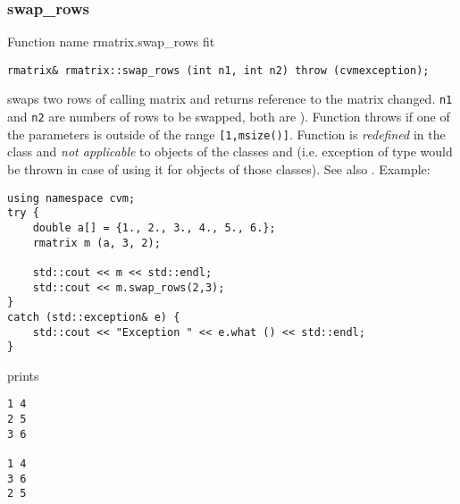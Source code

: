 \subsubsection{swap\_rows}
Function%
\pdfdest name {rmatrix.swap_rows} fit
\begin{verbatim}
rmatrix& rmatrix::swap_rows (int n1, int n2) throw (cvmexception);
\end{verbatim}
swaps two rows of  calling matrix and returns  reference to
the matrix changed. \verb"n1" and \verb"n2" are
 numbers of rows to be swapped,
both are \Based).
Function throws  
if one of the parameters is outside of the range
\verb"[1,msize()]".
Function is \emph{redefined} in  the class
 and
\emph{not applicable} to objects of the classes
 and
 (i.e. exception of
type  would be thrown
in case of using it for objects of those classes).
See also .
Example:
\begin{Verbatim}
using namespace cvm;
try {
    double a[] = {1., 2., 3., 4., 5., 6.};
    rmatrix m (a, 3, 2);

    std::cout << m << std::endl;
    std::cout << m.swap_rows(2,3);
}
catch (std::exception& e) {
    std::cout << "Exception " << e.what () << std::endl;
}
\end{Verbatim}
prints
\begin{Verbatim}
1 4
2 5
3 6

1 4
3 6
2 5
\end{Verbatim}
\newpage





